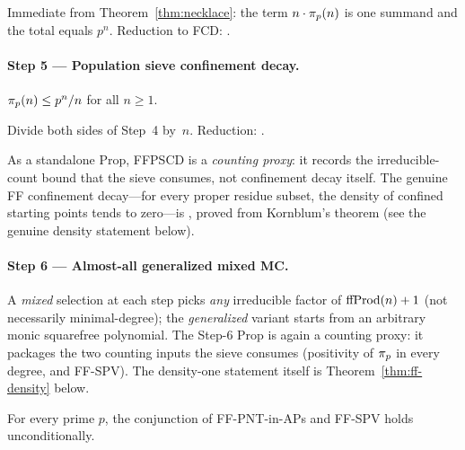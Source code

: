 \begin{theorem}
Immediate from Theorem~\ref{thm:necklace}: the term $n\cdot\pi_p(n)$
is one summand and the total equals $p^n$.  Reduction to FCD:
.
\end{theorem}

\paragraph{Step 5 --- Population sieve confinement decay.}
\begin{property}
$\pi_p(n) \leq p^n/n$ for all $n \geq 1$.
\end{property}

\begin{theorem}
Divide both sides of Step~4 by~$n$.  Reduction:
.
\end{theorem}

\noindent
As a standalone Prop, \textsf{FFPSCD} is a \emph{counting proxy}: it
records the irreducible-count bound that the sieve consumes, not
confinement decay itself.  The genuine FF confinement decay---for
every proper residue subset, the density of confined starting points
tends to zero---is
, proved
from Kornblum's theorem (see the genuine density statement
below).

\paragraph{Step 6 --- Almost-all generalized mixed MC.}
A \emph{mixed} selection at each step picks \emph{any} irreducible factor
of $\mathrm{ffProd}(n)+1$ (not necessarily minimal-degree); the
\emph{generalized} variant starts from an arbitrary monic squarefree
polynomial.  The Step-6 Prop
 is again a
counting proxy: it packages the two counting inputs the sieve consumes
(positivity of $\pi_p$ in every degree, and FF-SPV).  The
density-one statement itself is Theorem~\ref{thm:ff-density} below.

\begin{theorem}
\label{thm:ff-almost-all}
For every prime $p$, the conjunction of FF-PNT-in-APs and FF-SPV holds
unconditionally.
\end{theorem}

